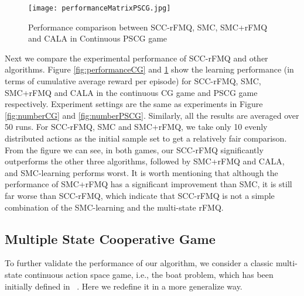 \documentclass[journal,transmag]{IEEEtran}
\begin{document}
\begin{figure}[h!]
\centering
\texttt{[image: performanceMatrixPSCG.jpg]}
\caption{Performance comparison between SCC-rFMQ, SMC, SMC+rFMQ and CALA in Continuous PSCG game}
\label{fig:performancePSCG}
\end{figure}
Next we compare the experimental performance of SCC-rFMQ and other algorithms. Figure \ref{fig:performanceCG} and \ref{fig:performancePSCG} show the learning performance (in terms of cumulative average reward per episode) for SCC-rFMQ, SMC, SMC+rFMQ and CALA in the continuous CG game and PSCG game respectively. Experiment settings are the same as experiments in Figure \ref{fig:numberCG} and \ref{fig:numberPSCG}. Similarly, all the results are averaged over 50 runs. For SCC-rFMQ, SMC and SMC+rFMQ, we take only 10 evenly distributed actions as the initial sample set to get a relatively fair comparison. From the figure we can see, in both games, our SCC-rFMQ significantly outperforms the other three algorithms, followed by SMC+rFMQ and CALA, and SMC-learning performs worst. It is worth mentioning that although the performance of SMC+rFMQ has a significant improvement than SMC, it is still far worse than SCC-rFMQ, which indicate that SCC-rFMQ is not a simple combination of the SMC-learning and the multi-state rFMQ.










\subsection{Multiple State Cooperative Game}
\label{subsection4.2}

To further validate the performance of our algorithm, we consider a classic multi-state continuous action space game, i.e., the boat problem, which has been initially defined in ~\cite{Jouffe1998}. Here we redefine it in a more generalize way.
\end{document}
